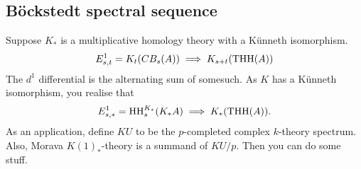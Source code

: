 \documentclass[11pt]{article}
\begin{document}
\begin{GeoffroyTopologicalHochschildHomology}
\subsection*{B\"ockstedt spectral sequence}
Suppose $K_*$ is a multiplicative homology theory with a K\"unneth isomorphism.
\[E^1_{s,t}=K_t(CB_s(A))\implies K_{s+t}(\textup{THH}(A))\]
The $d^1$ differential is the alternating sum of somesuch. As $K$ has a K\"unneth isomorphism, you realise that
\[E^1_{s,*}=\textup{HH}^{K_*}_s(K_*A)\implies K_*(\textup{THH}(A)).\]
As an application, define $KU$ to be the $p$-completed complex $k$-theory spectrum. Also, Morava $K(1)_*$-theory is a summand of $KU/p$. Then you can do some stuff.













\pagebreak
\end{GeoffroyTopologicalHochschildHomology}
\end{document}
